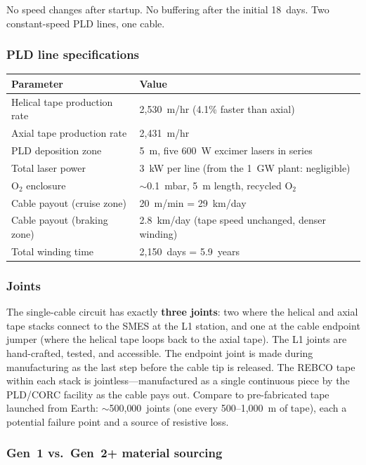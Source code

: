 \documentclass[12pt,letterpaper]{article}
\begin{document}
No speed changes after startup. No buffering after the initial 18~days. Two constant-speed PLD lines, one cable.

\subsubsection{PLD line specifications}

\begin{center}
\small
\begin{tabular}{ll}
\toprule
\textbf{Parameter} & \textbf{Value} \\
\midrule
Helical tape production rate & 2{,}530~m/hr (4.1\% faster than axial) \\
Axial tape production rate & 2{,}431~m/hr \\
PLD deposition zone & 5~m, five 600~W excimer lasers in series \\
Total laser power & 3~kW per line (from the 1~GW plant: negligible) \\
O$_2$ enclosure & ${\sim}$0.1~mbar, 5~m length, recycled O$_2$ \\
Cable payout (cruise zone) & 20~m/min = 29~km/day \\
Cable payout (braking zone) & 2.8~km/day (tape speed unchanged, denser winding) \\
Total winding time & 2{,}150~days = 5.9~years \\
\bottomrule
\end{tabular}
\end{center}

\subsubsection{Joints}

The single-cable circuit has exactly \textbf{three joints}: two where the helical and axial tape stacks connect to the SMES at the L1 station, and one at the cable endpoint jumper (where the helical tape loops back to the axial tape). The L1 joints are hand-crafted, tested, and accessible. The endpoint joint is made during manufacturing as the last step before the cable tip is released. The REBCO tape within each stack is jointless---manufactured as a single continuous piece by the PLD/CORC facility as the cable pays out. Compare to pre-fabricated tape launched from Earth: ${\sim}$500{,}000~joints (one every 500--1{,}000~m of tape), each a potential failure point and a source of resistive loss.

\subsubsection{Gen~1 vs.\ Gen~2+ material sourcing}
\end{document}
